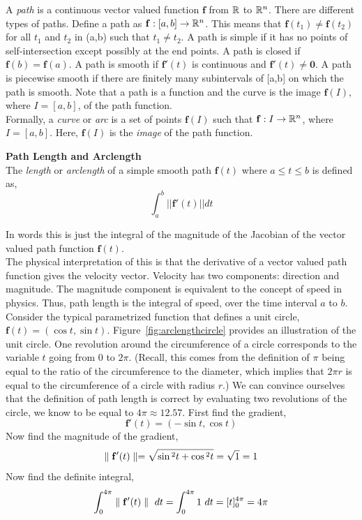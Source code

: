 \documentclass[12pt]{article}
\begin{document}
A \emph{path} is a continuous vector valued function $\mathbf{f}$ from $\mathbb{R}$ to $\mathbb{R}^n$. There are different types of paths. Define a path as $\mathbf{f}:[a,b]\rightarrow\mathbb{R}^n$. This means that $\mathbf{f}(t_1)\neq\mathbf{f}(t_2)$ for all $t_1$ and $t_2$ in (a,b) such that $t_1\neq t_2$. A path is simple if it has no points of self-intersection except possibly at the end points. A path is closed if $\mathbf{f}(b)=\mathbf{f}(a)$. A path is smooth if $\mathbf{f}'(t)$ is continuous and $\mathbf{f}'(t)\neq\mathbf{0}$. A path is piecewise smooth if there are finitely many subintervals of [a,b] on which the path is smooth. Note that a path is a function and the curve is the image $\mathbf{f}(I)$, where $I=[a,b]$, of the path function.\\

Formally, a \emph{curve} or \emph{arc} is a set of points $\mathbf{f}(I)$ such that $\mathbf{f}:I\rightarrow\mathbb{R}^n$, where $I=[a,b]$. Here, $\mathbf{f}(I)$ is the \emph{image} of the path function. \\

\begin{framed}
\textbf{Path Length and Arclength} \\
The \emph{length} or \emph{arclength} of a simple smooth path $\mathbf{f}(t)$ where $a\leq t \leq b$ is defined as,
\[
\int_a^b || \mathbf{f}'(t) || dt
\]
\end{framed}

In words this is just the integral of the magnitude of the Jacobian of the vector valued path function $\mathbf{f}(t)$. \\

The physical interpretation of this is that the derivative of a vector valued path function gives the velocity vector. Velocity has two components: direction and magnitude. The magnitude component is equivalent to the concept of speed in physics. Thus, path length is the integral of speed, over the time interval $a$ to $b$. \\ 

Consider the typical parametrized function that defines a unit circle, $\mathbf{f}(t) = (\cos{t},\sin{t})$. Figure~\ref{fig:arclengthcircle} provides an illustration of the unit circle. One revolution around the circumference of a circle corresponds to the variable $t$ going from $0$ to $2\pi$. (Recall, this comes from the definition of $\pi$ being equal to the ratio of the circumference to the diameter, which implies that $2\pi r$ is equal to the circumference of a circle with radius $r$.) We can convince ourselves that the definition of path length is correct by evaluating two revolutions of the circle, we know to be equal to $4\pi\approx 12.57$. First find the gradient,
\[
\mathbf{f}'(t) = (-\sin{t}, \cos{t})
\]
Now find the magnitude of the gradient,
\[
\parallel\mathbf{f}'(t)\parallel = \sqrt{\sin{^2t} + \cos{^2t}} = \sqrt{1} = 1
\]
Now find the definite integral,
\[
\int_{0}^{4\pi} \parallel\mathbf{f}'(t)\parallel \ dt = \int_{0}^{4\pi} 1 \ dt = [t]_{0}^{4\pi} = 4\pi
\]
\end{document}
